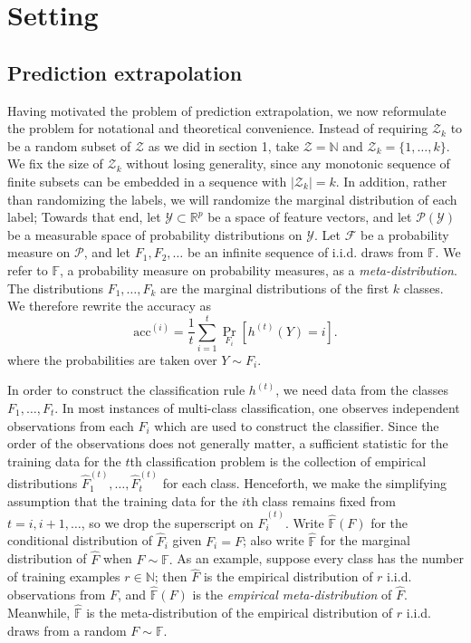 \documentclass{article}
\begin{document}
\section{Setting}

\subsection{Prediction extrapolation}

Having motivated the problem of prediction extrapolation,
we now reformulate the problem for notational and theoretical convenience.
Instead of requiring $\mathcal{Z}_k$ to be a random subset of $\mathcal{Z}$ as we did in section 1, take
$\mathcal{Z}=\mathbb{N}$ and $\mathcal{Z}_k = \{1,\hdots, k\}$.
We fix the size of $\mathcal{Z}_k$ without losing generality, since any monotonic sequence of 
finite subsets can be embedded in a sequence with $|\mathcal{Z}_k| = k$.
In addition, rather than randomizing the labels, we will randomize the marginal distribution of each label;
Towards that end, let $\mathcal{Y} \subset \mathbb{R}^p$ be a space of feature vectors, and
let $\mathcal{P}(\mathcal{Y})$ be a measurable space of probability distributions on $\mathcal{Y}$.
Let $\mathcal{F}$ be a probability measure on $\mathcal{P}$,
and let $F_1, F_2,\hdots$ be an infinite sequence of i.i.d. draws from $\mathbb{F}$.
We refer to $\mathbb{F}$, a probability measure on probability measures, as a \emph{meta-distribution}.
The distributions $F_1,\hdots, F_k$ are the marginal distributions of the first $k$ classes.
We therefore rewrite the accuracy as
\[
\text{acc}^{(i)} = \frac{1}{t}\sum_{i=1}^t \Pr_{F_i}[h^{(t)}(Y) = i].
\]
where the probabilities are taken over $Y \sim F_i$.

In order to construct the classification rule $h^{(t)}$, we need data from the classes $F_1,\hdots, F_t$.
In most instances of multi-class classification, one observes independent observations from each $F_i$
which are used to construct the classifier.  Since the order of the observations
does not generally matter, a sufficient statistic for the training data for the $t$th classification problem
is the collection of empirical distributions
$\hat{F}_1^{(t)},\hdots,\hat{F}_t^{(t)}$ for each class.
Henceforth, we make the simplifying assumption that the training data for the $i$th class remains fixed
from $t =i, i+1,\hdots$, so we drop the superscript on $\hat{F}_i^{(t)}$.
Write $\hat{\mathbb{F}}(F)$ for the conditional distribution of $\hat{F}_i$ given  $F_i = F$;
also write $\hat{\mathbb{F}}$ for the marginal distribution of $\hat{F}$ when $F \sim \mathbb{F}.$
As an example, suppose every class has the number of training examples $r \in \mathbb{N}$; then $\hat{F}$
is the empirical distribution of $r$ i.i.d. observations from $F$, and $\hat{\mathbb{F}}(F)$ is the \emph{empirical meta-distribution} of $\hat{F}$.
Meanwhile, $\hat{\mathbb{F}}$ is the meta-distribution of the empirical distribution of $r$ i.i.d. draws from a random $F \sim \mathbb{F}$.
\end{document}
